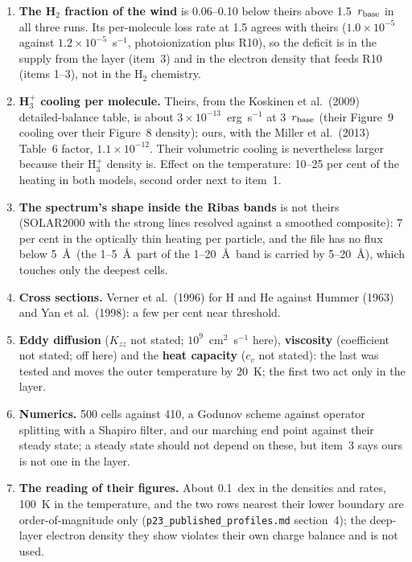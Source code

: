 \documentclass[english,a4paper]{my_memo}
\begin{document}
\begin{enumerate}
  from the same under-filled layer.
\item \textbf{The H$_2$ fraction of the wind} is 0.06--0.10 below theirs
  above 1.5~$r_{\rm base}$ in all three runs. Its per-molecule loss rate at
  1.5 agrees with theirs ($1.0\times10^{-5}$ against $1.2\times10^{-5}$~s$^{-1}$,
  photoionization plus R10), so the deficit is in the supply from the layer
  (item~3) and in the electron density that feeds R10 (items 1--3), not in
  the H$_2$ chemistry.
\item \textbf{H$_3^+$ cooling per molecule.} Theirs, from the Koskinen et
  al.\ (2009) detailed-balance table, is about $3\times10^{-13}$~erg~s$^{-1}$
  at 3~$r_{\rm base}$ (their Figure~9 cooling over their Figure~8 density);
  ours, with the Miller et al.\ (2013) Table~6 factor, $1.1\times10^{-12}$.
  Their volumetric cooling is nevertheless larger because their H$_3^+$
  density is. Effect on the temperature: 10--25 per cent of the heating in
  both models, second order next to item~1.
\item \textbf{The spectrum's shape inside the Ribas bands} is not theirs
  (SOLAR2000 with the strong lines resolved against a smoothed composite):
  7 per cent in the optically thin heating per particle, and the file has
  no flux below 5~\AA\ (the 1--5~\AA\ part of the 1--20~\AA\ band is carried
  by 5--20~\AA), which touches only the deepest cells.
\item \textbf{Cross sections.} Verner et al.\ (1996) for H and He against
  Hummer (1963) and Yan et al.\ (1998): a few per cent near threshold.
\item \textbf{Eddy diffusion} ($K_{zz}$ not stated; $10^9$~cm$^2$~s$^{-1}$
  here), \textbf{viscosity} (coefficient not stated; off here) and the
  \textbf{heat capacity} ($c_v$ not stated): the last was tested and moves
  the outer temperature by 20~K; the first two act only in the layer.
\item \textbf{Numerics.} 500 cells against 410, a Godunov scheme against
  operator splitting with a Shapiro filter, and our marching end point
  against their steady state; a steady state should not depend on these,
  but item~3 says ours is not one in the layer.
\item \textbf{The reading of their figures.} About 0.1~dex in the densities
  and rates, 100~K in the temperature, and the two rows nearest their lower
  boundary are order-of-magnitude only (\texttt{p23\_published\_profiles.md}
  section~4); the deep-layer electron density they show violates their own
  charge balance and is not used.
\end{enumerate}
\end{document}
